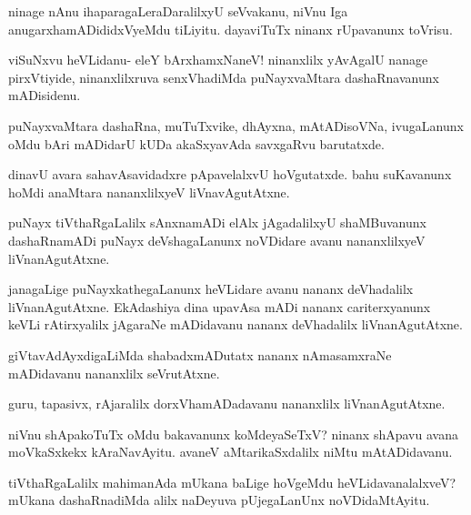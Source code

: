 \documentclass{article}
\begin{document}
\begin{mng}%
ninage nAnu ihaparagaLeraDaralilxyU seVvakanu, niVnu Iga
anugarxhamADididxVyeMdu tiLiyitu. dayaviTuTx ninanx rUpavanunx toVrisu.
\end{mng}

\begin{mng}%
viSuNxvu heVLidanu- eleY bArxhamxNaneV! ninanxlilx yAvAgalU
nanage pirxVtiyide, ninanxlilxruva senxVhadiMda puNayxvaMtara dashaRnavanunx mADisidenu.
\end{mng}

\begin{mng}%
puNayxvaMtara dashaRna, muTuTxvike, dhAyxna, mAtADisoVNa,
ivugaLanunx oMdu bAri mADidarU kUDa akaSxyavAda savxgaRvu barutatxde.
\end{mng}

\begin{mng}%
dinavU avara sahavAsavidadxre pApavelalxvU hoVgutatxde. bahu
suKavanunx hoMdi anaMtara nananxlilxyeV liVnavAgutAtxne.
\end{mng}

\begin{mng}%
puNayx tiVthaRgaLalilx sAnxnamADi elAlx jAgadalilxyU shaMBuvanunx
dashaRnamADi puNayx deVshagaLanunx noVDidare avanu nananxlilxyeV 
liVnanAgutAtxne.
\end{mng}

\begin{mng}%
janagaLige puNayxkathegaLanunx heVLidare avanu nananx deVhadalilx
liVnanAgutAtxne. EkAdashiya dina upavAsa mADi nananx cariterxyanunx
keVLi rAtirxyalilx jAgaraNe mADidavanu nananx deVhadalilx liVnanAgutAtxne.
\end{mng}

\begin{mng}%
giVtavAdAyxdigaLiMda shabadxmADutatx nananx nAmasamxraNe mADidavanu
nananxlilx seVrutAtxne.
\end{mng}

\begin{mng}%
guru, tapasivx, rAjaralilx dorxVhamADadavanu nananxlilx liVnanAgutAtxne.
\end{mng}

\begin{mng}%
niVnu shApakoTuTx oMdu bakavanunx koMdeyaSeTxV? ninanx
shApavu avana moVkaSxkekx kAraNavAyitu. avaneV aMtarikaSxdalilx niMtu
mAtADidavanu.
\end{mng}

\begin{mng}%
tiVthaRgaLalilx mahimanAda mUkana baLige hoVgeMdu heVLidavanalalxveV?
mUkana dashaRnadiMda alilx naDeyuva pUjegaLanUnx noVDidaMtAyitu.
\end{mng}
\end{document}

